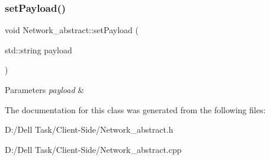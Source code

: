\subsubsection{\texorpdfstring{set\+Payload()}{setPayload()}}
{\footnotesize\ttfamily void Network\+\_\+abstract\+::set\+Payload (\begin{DoxyParamCaption}\item[{std\+::string}]{payload }\end{DoxyParamCaption})}






\begin{DoxyParams}{Parameters}
{\em payload} & \\
\hline
\end{DoxyParams}


The documentation for this class was generated from the following files\+:\begin{DoxyCompactItemize}
\item 
D\+:/\+Dell Task/\+Client-\/\+Side/Network\+\_\+abstract.\+h\item 
D\+:/\+Dell Task/\+Client-\/\+Side/Network\+\_\+abstract.\+cpp\end{DoxyCompactItemize}
